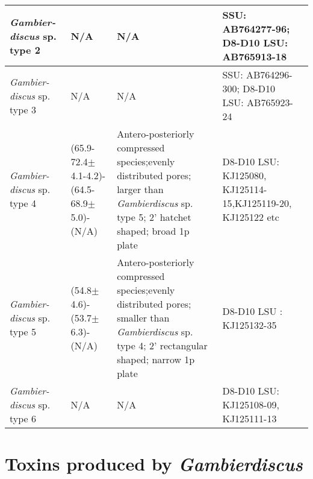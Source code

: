 \documentclass[12pt]{article}
\begin{document}
\begin{longtable}{ |  p{2cm} | p{2.7cm} | p{4.5cm} | p{3.1cm} | p{1cm} | }
\hline
\emph{Gambier- discus} sp. type 2 & N/A & N/A & SSU: AB764277-96; D8-D10 LSU: AB765913-18 & \cite{kuno2010genetic,nishimura2013genetic} \\
\hline
\emph{Gambier- discus} sp. type 3 & N/A & N/A & SSU: AB764296-300; D8-D10 LSU: AB765923-24 & \cite{nishimura2013genetic} \\
\hline
\emph{Gambier- discus} sp. type 4  & (65.9-72.4$\pm$4.1-4.2)-(64.5-68.9$\pm$5.0)-(N/A) & Antero-posteriorly compressed species;evenly distributed pores; larger than \emph{Gambierdiscus} sp. type 5; 2' hatchet shaped; broad 1p plate & D8-D10 LSU: KJ125080, KJ125114-15,KJ125119-20, KJ125122 etc  & \cite{xu2014distribution} \\
\hline
\emph{Gambier- discus} sp. type 5  & (54.8$\pm$4.6)-(53.7$\pm$6.3)- (N/A) & Antero-posteriorly compressed species;evenly distributed pores; smaller than \emph{Gambierdiscus} sp. type 4; 2' rectangular shaped; narrow 1p plate & D8-D10 LSU : KJ125132-35 & \cite{xu2014distribution} \\
\hline
 \emph{Gambier- discus} sp. type 6 & N/A & N/A & D8-D10 LSU: KJ125108-09, KJ125111-13 & \cite{xu2014distribution} \\
 \hline
\end{longtable}
\FloatBarrier

\section{Toxins produced by \emph{Gambierdiscus}}

\end{document}
